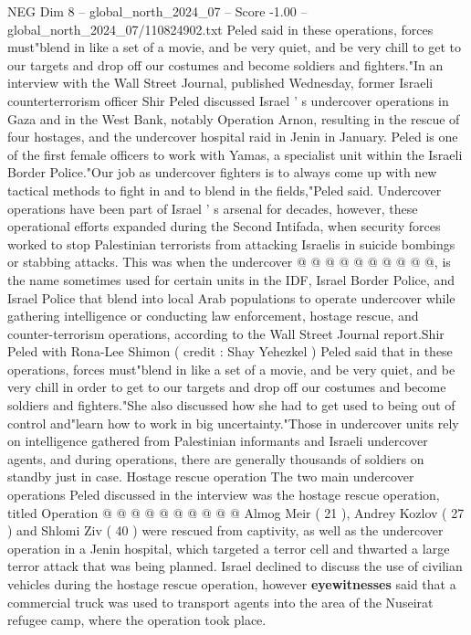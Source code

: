 \begin{textsample}{NEG Dim 8 – global\_north\_2024\_07 – Score -1.00 – global\_north\_2024\_07/110824902.txt}  \label{ex:f8_neg_411}
Peled said in these operations, forces must"blend in like a set of a movie, and be very quiet, and be very chill to get to our targets and drop off our costumes and become soldiers and fighters."In an interview with the Wall Street Journal, published Wednesday, former Israeli counterterrorism officer Shir Peled discussed Israel ' s undercover operations in Gaza and in the West Bank, notably Operation Arnon, resulting in the rescue of four hostages, and the undercover hospital raid in Jenin in January.
Peled is one of the first female officers to work with Yamas, a specialist unit within the Israeli Border Police."Our job as undercover fighters is to always come up with new tactical methods to fight in and to blend in the fields,"Peled said.
Undercover operations have been part of Israel ' s arsenal for decades, however, these operational efforts expanded during the Second Intifada, when security forces worked to stop Palestinian terrorists from attacking Israelis in suicide bombings or stabbing attacks.
This was when the undercover @ @ @ @ @ @ @ @ @ @, is the name sometimes used for certain units in the IDF, Israel Border Police, and Israel Police that blend into local Arab populations to operate undercover while gathering intelligence or conducting law enforcement, hostage rescue, and counter-terrorism operations, according to the Wall Street Journal report.Shir Peled with Rona-Lee Shimon ( credit : Shay Yehezkel ) Peled said that in these operations, forces must"blend in like a set of a movie, and be very quiet, and be very chill in order to get to our targets and drop off our costumes and become soldiers and fighters."She also discussed how she had to get used to being out of control and"learn how to work in big uncertainty."Those in undercover units rely on intelligence gathered from Palestinian informants and Israeli undercover agents, and during operations, there are generally thousands of soldiers on standby just in case.
Hostage rescue operation The two main undercover operations Peled discussed in the interview was the hostage rescue operation, titled Operation @ @ @ @ @ @ @ @ @ @ Almog Meir ( 21 ), Andrey Kozlov ( 27 ) and Shlomi Ziv ( 40 ) were rescued from captivity, as well as the undercover operation in a Jenin hospital, which targeted a terror cell and thwarted a large terror attack that was being planned.
Israel declined to discuss the use of civilian vehicles during the hostage rescue operation, however \textbf{eyewitnesses} said that a commercial truck was used to transport agents into the area of the Nuseirat refugee camp, where the operation took place.

\end{textsample}

